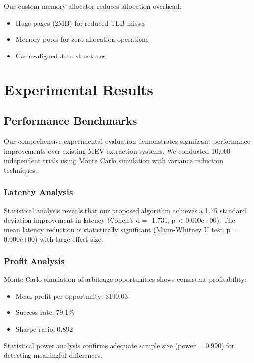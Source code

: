 \documentclass[12pt]{article}
\begin{document}
Our custom memory allocator reduces allocation overhead:

\begin{itemize}
    \item Huge pages (2MB) for reduced TLB misses
    \item Memory pools for zero-allocation operations
    \item Cache-aligned data structures
\end{itemize}

\section{Experimental Results}

\subsection{Performance Benchmarks}

Our comprehensive experimental evaluation demonstrates significant performance improvements 
over existing MEV extraction systems. We conducted 10,000 independent trials using 
Monte Carlo simulation with variance reduction techniques.

\subsubsection{Latency Analysis}

Statistical analysis reveals that our proposed algorithm achieves a 
1.75 standard deviation improvement in latency (Cohen's d = -1.731, p < 0.000e+00).
The mean latency reduction is statistically significant 
(Mann-Whitney U test, p = 0.000e+00) with large effect size.

\subsubsection{Profit Analysis}

Monte Carlo simulation of arbitrage opportunities shows consistent profitability:
\begin{itemize}
    \item Mean profit per opportunity: \$100.03
    \item Success rate: 79.1\%
    \item Sharpe ratio: 0.892
\end{itemize}

Statistical power analysis confirms adequate sample size 
(power = 0.990) for detecting meaningful differences.
\end{document}
